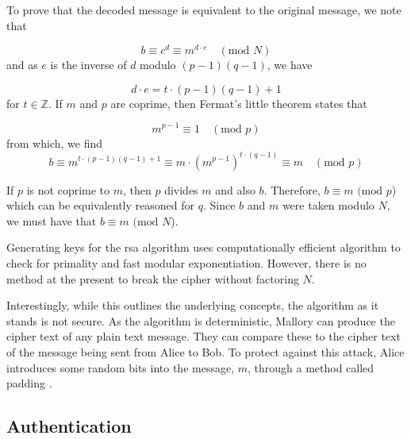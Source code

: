 To prove that the decoded message is equivalent to the original message, we note that

\begin{equation}
	b \equiv c^d \equiv m ^{d\cdot e}\quad(\text{mod } N)
\end{equation} 
and as $e$ is the inverse of $d$ modulo $(p - 1)(q - 1)$, we have

\begin{equation}
	d \cdot e = t \cdot (p - 1)(q - 1) + 1
\end{equation}
for $t\in\mathbb{Z}$. If $m$ and $p$ are coprime, then Fermat's little theorem states that 

\begin{equation}
	m^{p-1} \equiv 1\quad(\text{mod }p)
\end{equation}
from which, we find
\begin{equation}
	b \equiv m^{t \cdot (p - 1)(q - 1) + 1} \equiv m \cdot (m^{p-1})^{t\cdot(q-1)} \equiv m \quad(\text{mod } p)
\end{equation}

If $p$ is not coprime to $m$, then $p$ divides $m$ and also $b$. Therefore, $b\equiv m \text{ (mod } p$) which can be equivalently reasoned for $q$. Since $b$ and $m$ were taken modulo $N$, we must have that $b\equiv m \text{ (mod } N$).

Generating keys for the \ac{rsa} algorithm uses computationally efficient algorithm to check for primality and fast modular exponentiation. However, there is no method at the present to break the cipher without factoring $N$. 

Interestingly, while this outlines the underlying concepts, the algorithm as it stands is not secure. As the algorithm is deterministic, Mallory can produce the cipher text of any plain text message. They can compare these to the cipher text of the message being sent from Alice to Bob. To protect against this attack, Alice introduces some random bits into the message, $m$, through a method called padding \cite{goldwasser1982probabilistic}. 



\subsection{Authentication}

